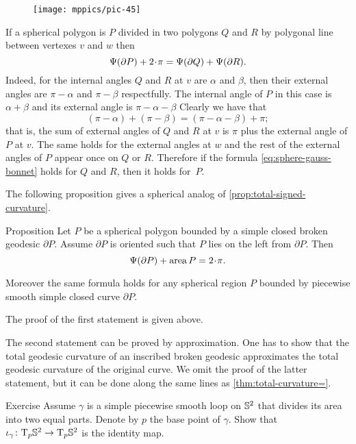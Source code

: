 \begin{wrapfigure}{o}{42 mm}
\vskip-0mm
\centering
\texttt{[image: mppics/pic-45]}
\vskip-0mm
\end{wrapfigure}

If a spherical polygon is $P$ divided in two polygons $Q$ and $R$ by polygonal line between vertexes $v$ and $w$
then 
\[\tgc{\partial P}+2\cdot\pi =\tgc{\partial Q}+\tgc{\partial R}.\]
Indeed, for the internal angles $Q$ and $R$ at $v$ are $\alpha$ and $\beta$,
then their external angles are $\pi-\alpha$ and $\pi-\beta$ respectfully.
The internal angle of $P$ in this case is $\alpha+\beta$ and its external angle is $\pi-\alpha-\beta$
Clearly we have that 
\[(\pi-\alpha)+(\pi-\beta)=(\pi-\alpha-\beta)+\pi;\]
that is, the sum of external angles of $Q$ and $R$ at $v$ is $\pi$ plus the external angle of $P$ at $v$. 
The same holds for the external angles at $w$ and the rest of the external angles of $P$ appear once on $Q$ or $R$.
Therefore if the formula \ref{eq:sphere-gauss-bonnet} holds for $Q$ and $R$,
then it holds for~$P$.

The following proposition gives a spherical analog of \ref{prop:total-signed-curvature}.

\begin{thm}{Proposition}\label{prop:area-of-spher-polygon}
Let $P$ be a spherical polygon bounded by a simple closed broken geodesic $\partial P$.
Assume $\partial P$ is oriented such that $P$ lies on the left from $\partial P$.
Then 
\[\tgc{\partial P}+\area P=2\cdot \pi.\]

Moreover the same formula holds for any spherical region $P$ bounded by piecewise smooth simple closed curve $\partial P$.
\end{thm}

The proof of the first statement is given above. 

The second statement can be proved by approximation. One has to show that the total geodesic curvature of an inscribed broken geodesic approximates the total geodesic curvature of the original curve.
We omit the proof of the latter statement, but it can be done along the same lines as \ref{thm:total-curvature=}.
\qeds


\begin{thm}{Exercise}\label{ex:half-sphere-total-curvature}
Assume $\gamma$ is a simple piecewise smooth loop on $\mathbb{S}^2$ that divides its area into two equal parts.
Denote by $p$ the base point of $\gamma$.
Show that $\iota_\gamma\colon\mathrm{T}_p\mathbb{S}^2\to\mathrm{T}_p\mathbb{S}^2$ is the identity map.
\end{thm}

